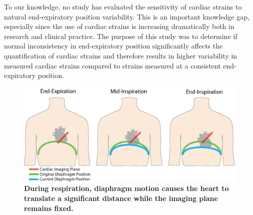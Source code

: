 	To our knowledge, no study has evaluated the sensitivity of cardiac strains to natural end-expiratory position variability. This is an important knowledge gap, especially since the use of cardiac strains is increasing dramatically both in research and clinical practice. The purpose of this study was to determine if normal inconsistency in end-expiratory position significantly affects the quantification of cardiac strains and therefore results in higher variability in measured cardiac strains compared to strains measured at a consistent end-expiratory position.
	
	\begin{figure} 
		\includegraphics{figures/strainpaper/Fig1-range_of_diaphragm_position_breathing}
		\caption[During respiration, diaphragm motion causes the heart to translate a significant distance while the imaging plane remains fixed]{\textbf{During respiration, diaphragm motion causes the heart to translate a significant distance while the imaging plane remains fixed.}}
		\label{fig:diaphragmTranslation}
	\end{figure}
	
	

